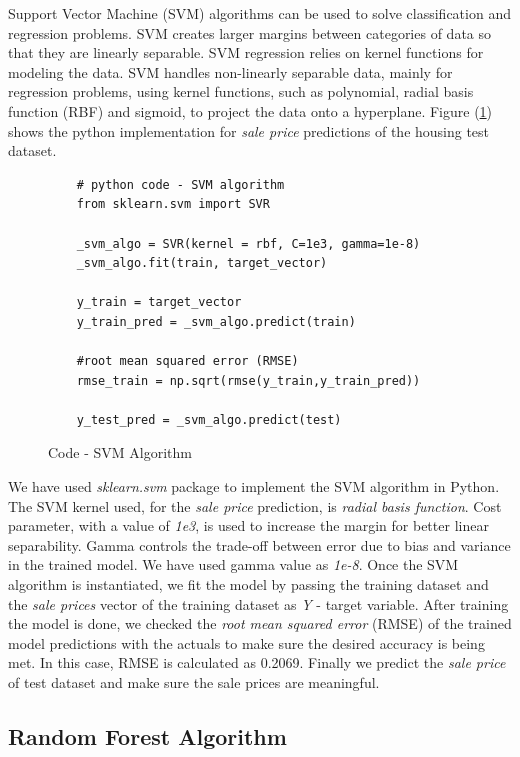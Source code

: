 \documentclass[sigconf]{acmart}
\begin{document}
	Support Vector Machine (SVM) algorithms can be used to solve classification and regression problems. SVM creates larger margins between categories of data so that they are linearly separable. SVM regression relies on kernel functions for modeling the data. SVM handles non-linearly separable data, mainly for regression problems, using kernel functions, such as polynomial, radial basis function (RBF) and sigmoid, to project the data onto a hyperplane. Figure (\ref{c:svm}) shows the python implementation for {\em sale price} predictions of the housing test dataset.
	
	\begin{figure}[htb]	
	\begin{verbatim}	
	# python code - SVM algorithm
	from sklearn.svm import SVR	
		
	_svm_algo = SVR(kernel = rbf, C=1e3, gamma=1e-8)		
	_svm_algo.fit(train, target_vector)    
			
	y_train = target_vector
	y_train_pred = _svm_algo.predict(train)
	
	#root mean squared error (RMSE)
	rmse_train = np.sqrt(rmse(y_train,y_train_pred))
	
	y_test_pred = _svm_algo.predict(test)	
	\end{verbatim}
	\caption{Code - SVM Algorithm} \label{c:svm} 
	\end{figure}
	
    We have used {\em sklearn.svm} package to implement the SVM algorithm in Python. The SVM kernel used, for the {\em sale price} prediction, is {\em radial basis function}. Cost parameter, with a value of {\em 1e3}, is used to increase the margin for better linear separability. Gamma controls the trade-off between error due to bias and variance in the trained model. We have used gamma value as {\em 1e-8}. Once the SVM algorithm is instantiated, we fit the model by passing the training dataset and the {\em sale prices} vector of the training dataset as {\em Y} - target variable. After training the model is done, we checked the {\em root mean squared error} (RMSE) of the trained model predictions with the actuals to make sure the desired accuracy is being met. In this case, RMSE is calculated as 0.2069. Finally we predict the {\em sale price} of test dataset and make sure the sale prices are meaningful.
        
	\subsection{Random Forest Algorithm}
\end{document}
